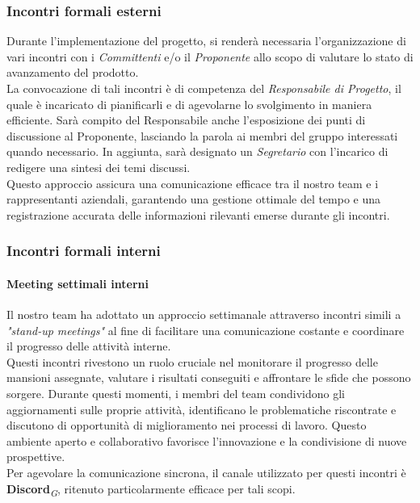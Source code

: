 \documentclass{article}
\begin{document}
        \subsubsection{Incontri formali esterni}
        Durante l'implementazione del progetto, si renderà necessaria l'organizzazione di vari incontri con i \textit{Committenti} e/o il \textit{Proponente} allo scopo di valutare lo stato di avanzamento del prodotto.\\
        La convocazione di tali incontri è di competenza del \textit{Responsabile di Progetto}, il quale è incaricato di pianificarli e di agevolarne lo svolgimento in maniera efficiente. Sarà compito del Responsabile anche l'esposizione dei punti di discussione al Proponente, lasciando la parola ai membri del gruppo interessati quando necessario.
        In aggiunta, sarà designato un \textit{Segretario} con l'incarico di redigere una sintesi dei temi discussi. \\
        Questo approccio assicura una comunicazione efficace tra il nostro team e i rappresentanti aziendali, garantendo una gestione ottimale del tempo e una registrazione accurata delle informazioni rilevanti emerse durante gli incontri.
               
        \subsubsection{Incontri formali interni}
        \paragraph{Meeting settimali interni}
        Il nostro team ha adottato un approccio settimanale attraverso incontri simili a \textit{"stand-up meetings"} al fine di facilitare una comunicazione costante e coordinare il progresso delle attività interne.\\
        Questi incontri rivestono un ruolo cruciale nel monitorare il progresso delle mansioni assegnate, valutare i risultati conseguiti e affrontare le sfide che possono sorgere. Durante questi momenti, i membri del team condividono gli aggiornamenti sulle proprie attività, identificano le problematiche riscontrate e discutono di opportunità di miglioramento nei processi di lavoro. Questo ambiente aperto e collaborativo favorisce l'innovazione e la condivisione di nuove prospettive.\\
        Per agevolare la comunicazione sincrona, il canale utilizzato per questi incontri è \textbf{Discord}\textsubscript{\textit{G}}, ritenuto particolarmente efficace per tali scopi.
\end{document}
